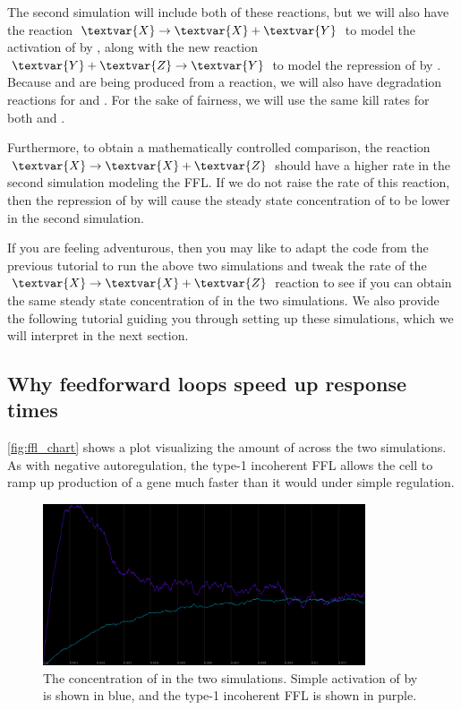 The second simulation will include both of these reactions, but we will also have the reaction $\textvar{X} \rightarrow \textvar{X} + \textvar{Y}$ to model the activation of  by , along with the new reaction $\textvar{Y} + \textvar{Z} \rightarrow \textvar{Y}$ to model the repression of  by . Because  and  are being produced from a reaction, we will also have degradation reactions for  and . For the sake of fairness, we will use the same kill rates for both  and .

Furthermore, to obtain a mathematically controlled comparison, the reaction $\textvar{X} \rightarrow \textvar{X} + \textvar{Z}$ should have a higher rate in the second simulation modeling the FFL. If we do not raise the rate of this reaction, then the repression of  by  will cause the steady state concentration of  to be lower in the second simulation.

If you are feeling adventurous, then you may like to adapt the code from the previous tutorial to run the above two simulations and tweak the rate of the $\textvar{X} \rightarrow \textvar{X} + \textvar{Z}$ reaction to see if you can obtain the same steady state concentration of  in the two simulations. We also provide the following tutorial guiding you through setting up these simulations, which we will interpret in the next section.


\FloatBarrier
{}
\subsection{Why feedforward loops speed up response times}

\autoref{fig:ffl_chart} shows a plot visualizing the amount of  across the two simulations. As with negative autoregulation, the type-1 incoherent FFL allows the cell to ramp up production of a gene  much faster than it would under simple regulation.\\

\begin{figure}[h]
\centering
\mySfFamily
\includegraphics[width = 0.85\textwidth]{../images/cellblender_ffl.png}
\caption{The concentration of  in the two simulations. Simple activation of  by  is shown in blue, and the type-1 incoherent FFL is shown in purple.}
\label{fig:ffl_chart}
\end{figure}

